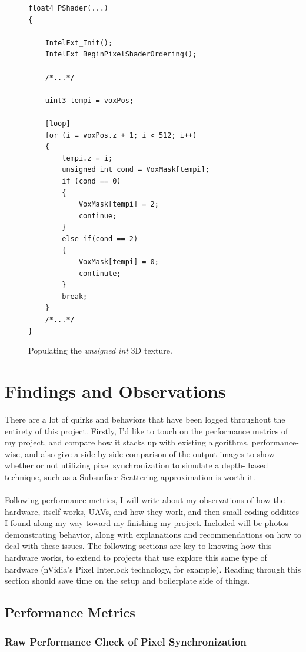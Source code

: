 \documentclass[a4paper, 12pt]{article}
\begin{document}
\begin{figure}[h]
\begin{lstlisting}[breaklines=true,language=HLSL]
float4 PShader(...)
{

	IntelExt_Init();
	IntelExt_BeginPixelShaderOrdering();

	/*...*/

	uint3 tempi = voxPos;

	[loop]
	for (i = voxPos.z + 1; i < 512; i++)
	{
		tempi.z = i;
		unsigned int cond = VoxMask[tempi];
		if (cond == 0)
		{
			VoxMask[tempi] = 2;
			continue;
		}
		else if(cond == 2)
		{
			VoxMask[tempi] = 0;
			continute;
		}
		break;
	}
	/*...*/
}
\end{lstlisting}
\caption{Populating the \textit{unsigned int} 3D texture.}
\label{code:3DTexPop}
\end{figure}

\section{Findings and Observations}

There are a lot of quirks and behaviors that have been logged throughout the
entirety of this project. Firstly, I'd like to touch on the performance
metrics of my project, and compare how it stacks up with existing algorithms,
performance-wise, and also give a side-by-side comparison of the output images
to show whether or not utilizing pixel synchronization to simulate a depth-
based technique, such as a Subsurface Scattering approximation is worth it. \\
\\ Following performance metrics, I will write about my observations of how
the hardware, itself works, UAVs, and how they work, and then small coding
oddities I found along my way toward my finishing my project. Included will be
photos demonstrating behavior, along with explanations and recommendations on
how to deal with these issues. The following sections are key to knowing how
this hardware works, to extend to projects that use explore this same type of
hardware (nVidia's Pixel Interlock technology, for example). Reading through
this section should save time on the setup and boilerplate side of things.

\subsection{Performance Metrics}
\label{section:findings}
\subsubsection{Raw Performance Check of Pixel Synchronization}
\end{document}
